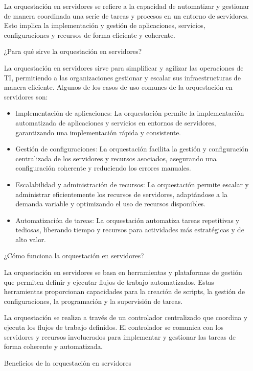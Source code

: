 \documentclass[12pt]{article}
\begin{document}
La orquestación en servidores se refiere a la capacidad de automatizar y gestionar de manera coordinada una serie de tareas y procesos en un entorno de servidores. Esto implica la implementación y gestión de aplicaciones, servicios, configuraciones y recursos de forma eficiente y coherente.

¿Para qué sirve la orquestación en servidores?
 
La orquestación en servidores sirve para simplificar y agilizar las operaciones de TI, permitiendo a las organizaciones gestionar y escalar sus infraestructuras de manera eficiente. Algunos de los casos de uso comunes de la orquestación en servidores son:
\begin{itemize}
    \item Implementación de aplicaciones: La orquestación permite la implementación automatizada de aplicaciones y servicios en entornos de servidores, garantizando una implementación rápida y consistente.
    \item Gestión de configuraciones: La orquestación facilita la gestión y configuración centralizada de los servidores y recursos asociados, asegurando una configuración coherente y reduciendo los errores manuales.
    \item Escalabilidad y administración de recursos: La orquestación permite escalar y administrar eficientemente los recursos de servidores, adaptándose a la demanda variable y optimizando el uso de recursos disponibles.
    \item Automatización de tareas: La orquestación automatiza tareas repetitivas y tediosas, liberando tiempo y recursos para actividades más estratégicas y de alto valor.
\end{itemize}

¿Cómo funciona la orquestación en servidores?
 
La orquestación en servidores se basa en herramientas y plataformas de gestión que permiten definir y ejecutar flujos de trabajo automatizados. Estas herramientas proporcionan capacidades para la creación de scripts, la gestión de configuraciones, la programación y la supervisión de tareas.
 
La orquestación se realiza a través de un controlador centralizado que coordina y ejecuta los flujos de trabajo definidos. El controlador se comunica con los servidores y recursos involucrados para implementar y gestionar las tareas de forma coherente y automatizada.

Beneficios de la orquestación en servidores
\end{document}
